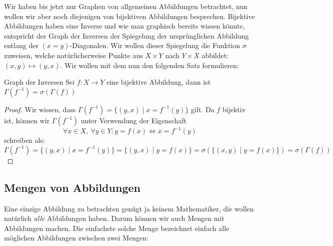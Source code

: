 Wir haben bis jetzt nur Graphen von allgemeinen Abbildungen betrachtet, nun wollen wir aber noch diejenigen von bijektiven Abbildungen besprechen. Bijektive Abbildungen haben eine Inverse und wie man graphisch bereits wissen könnte, entspricht der Graph der Inversen der Spiegelung der ursprünglichen Abbildung entlang der $(x=y)$-Diagonalen. Wir wollen dieser Spiegelung die Funktion $\sigma$ zuweisen, welche natürlicherweise Punkte aus $X \times Y$ nach $Y \times X$ abbildet: $(x,y) \mapsto (y,x)$. Wir wollen mit dem nun den folgenden Satz formulieren:

\begin{satz}{Graph der Inversen}{}
Sei $f: X \to Y$ eine bijektive Abbildung, dann ist $\Gamma(f^{-1})=\sigma(\Gamma(f))$
\end{satz}

\begin{proof}
Wir wissen, dass $\Gamma(f^{-1}) = \{ (y, x) \mid x = f^{-1}(y)\}$ gilt. Da $f$ bijektiv ist, können wir $\Gamma(f^{-1})$ unter Verwendung der Eigenschaft $$\forall x \in X, \ \forall y \in Y: y = f(x) \iff x = f^{-1}(y)$$ schreiben als:
$$\Gamma(f^{-1}) = \{ (y, x) \mid x = f^{-1}(y)\} = \{ (y, x) \mid y = f(x)\} = \sigma(\{ (x, y) \mid y = f(x)\}) = \sigma(\Gamma(f))$$
\end{proof}

\subsection{Mengen von Abbildungen}
Eine einzige Abbildung zu betrachten genügt ja keinem Mathematiker, die wollen natürlich \textit{alle} Abbildungen haben. Darum können wir auch Mengen mit Abbildungen machen. Die einfachste solche Menge bezeichnet einfach alle möglichen Abbildungen zwischen zwei Mengen:

